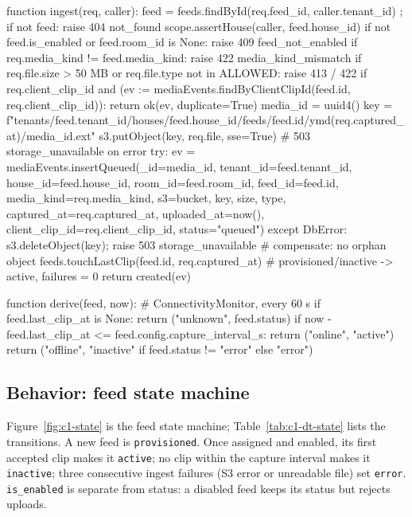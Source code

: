 \begin{Shaded}
\begin{Code}
function ingest(req, caller):
    feed = feeds.findById(req.feed_id, caller.tenant_id)      ; if not feed: raise 404 not_found
    scope.assertHouse(caller, feed.house_id)
    if not feed.is_enabled or feed.room_id is None:          raise 409 feed_not_enabled
    if req.media_kind != feed.media_kind:                     raise 422 media_kind_mismatch
    if req.file.size > 50 MB or req.file.type not in ALLOWED: raise 413 / 422
    if req.client_clip_id and (ev := mediaEvents.findByClientClipId(feed.id, req.client_clip_id)):
        return ok(ev, duplicate=True)
    media_id = uuid4()
    key = f"tenants/{feed.tenant_id}/houses/{feed.house_id}/feeds/{feed.id}/{ymd(req.captured_at)}/{media_id}.{ext}"
    s3.putObject(key, req.file, sse=True)                      # 503 storage_unavailable on error
    try:
        ev = mediaEvents.insertQueued(_id=media_id, tenant_id=feed.tenant_id, house_id=feed.house_id,
                 room_id=feed.room_id, feed_id=feed.id, media_kind=req.media_kind, s3={bucket, key, size, type},
                 captured_at=req.captured_at, uploaded_at=now(), client_clip_id=req.client_clip_id, status="queued")
    except DbError:
        s3.deleteObject(key); raise 503 storage_unavailable     # compensate: no orphan object
    feeds.touchLastClip(feed.id, req.captured_at)              # provisioned/inactive -> active, failures = 0
    return created(ev)

function derive(feed, now):                                    # ConnectivityMonitor, every 60 s
    if feed.last_clip_at is None:                       return ("unknown", feed.status)
    if now - feed.last_clip_at <= feed.config.capture_interval_s: return ("online", "active")
    return ("offline", "inactive" if feed.status != "error" else "error")
\end{Code}
\end{Shaded}

\subsection{Behavior: feed state machine}
Figure~\ref{fig:c1-state} is the feed state machine; Table~\ref{tab:c1-dt-state} lists the transitions. A new feed is
\texttt{provisioned}. Once assigned and enabled, its first accepted clip makes it \texttt{active}; no clip within the
capture interval makes it \texttt{inactive}; three consecutive ingest failures (S3 error or unreadable file) set
\texttt{error}. \texttt{is\_enabled} is separate from status: a disabled feed keeps its status but rejects uploads.

